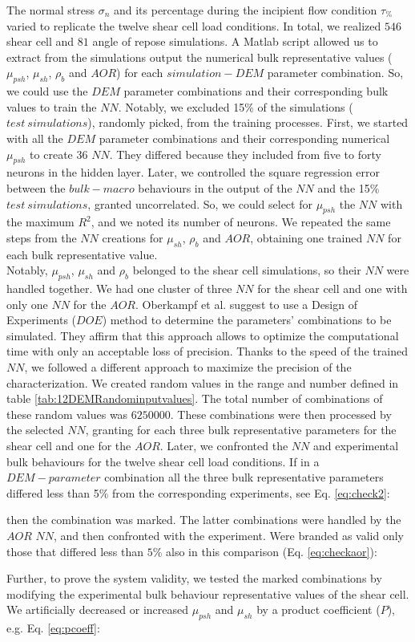 The normal stress $\sigma_n$ and its
percentage during the incipient flow condition $\tau_{\%}$
varied to replicate the twelve shear cell load conditions. 
In total, we realized $546$ shear cell and $81$ angle of repose simulations.
A Matlab script allowed us to extract from the simulations output the numerical
bulk representative values ($\mu_{psh}$, $\mu_{sh}$, $\rho_b$ and $AOR$) for each $simulation-DEM$ parameter combination. 
So, we could use the $DEM$ parameter combinations and their corresponding bulk values to train the $NN$. 
Notably, we excluded 15\% of the simulations ($test ~ simulations$), randomly
picked, from the training processes.
First, we started with all the $DEM$ parameter combinations and their corresponding numerical $\mu_{psh}$ to create 36 $NN$. 
They differed because they included from five to forty neurons in the hidden
layer.
Later, we controlled the square regression error between the $bulk-macro$ behaviours in the output of 
the $NN$ and the 15\% $test ~ simulations$, granted uncorrelated. 
So, we could select for $\mu_{psh}$ the $NN$ with the maximum $R^2$, and we noted its number of neurons. 
We repeated the same steps from the $NN$ creations for $\mu_{sh}$, $\rho_b$ and $AOR$, 
obtaining one trained $NN$ for each bulk representative value. \\
Notably, $\mu_{psh}$, $\mu_{sh}$ and $\rho_b$ belonged to the shear cell
simulations, so their $NN$ were handled together. 
We had one cluster of three $NN$ for the shear cell and one with only one $NN$
for the $AOR$.
Oberkampf et al. \cite{RefWorks:160} suggest to use a Design of Experiments
($DOE$) method to determine the parameters' combinations to be simulated.
They affirm that this approach allows to optimize the computational time with
only an acceptable loss of precision.
Thanks to the speed of the trained $NN$, we followed a different approach to
maximize the precision of the characterization.
We created random values
in the range and number defined in table \ref{tab:12DEMRandominputvalues}.
The total number of combinations of these random values was $6250000$. These
combinations were then processed by the selected $NN$, granting for each three bulk representative parameters for the shear cell and one for the $AOR$. Later, we confronted the $NN$ and experimental bulk behaviours for the twelve shear cell load conditions. 
If in a $DEM-parameter$ combination all the three bulk representative parameters differed less 
than 5\% from the corresponding experiments, see Eq. \ref{eq:check2}:

then the combination was marked. The latter combinations were handled by the
$AOR$ $NN$, and then confronted with the experiment.
Were branded as valid only those that differed less than $5\%$ also in this
comparison (Eq. \ref{eq:checkaor}):

Further, to prove the system validity, we tested the marked combinations by
modifying the experimental bulk behaviour representative values of the shear cell. 
We artificially decreased or increased $\mu_{psh}$ and $\mu_{sh}$ by a product
coefficient ($P$), e.g. Eq. \ref{eq:pcoeff}:





%
